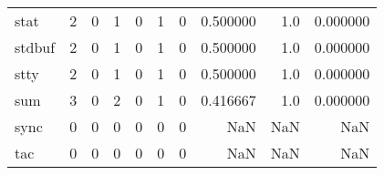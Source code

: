 \begin{longtable}{lrrrrrrrrr}
stat      &                                       2 &                                                  0 &                                                  1 &                                                  0 &                                                  1 &                                                  0 &                                           0.500000 &                                    1.0 &                             0.000000 \\
stdbuf    &                                       2 &                                                  0 &                                                  1 &                                                  0 &                                                  1 &                                                  0 &                                           0.500000 &                                    1.0 &                             0.000000 \\
stty      &                                       2 &                                                  0 &                                                  1 &                                                  0 &                                                  1 &                                                  0 &                                           0.500000 &                                    1.0 &                             0.000000 \\
sum       &                                       3 &                                                  0 &                                                  2 &                                                  0 &                                                  1 &                                                  0 &                                           0.416667 &                                    1.0 &                             0.000000 \\
sync      &                                       0 &                                                  0 &                                                  0 &                                                  0 &                                                  0 &                                                  0 &                                                NaN &                                    NaN &                                  NaN \\
tac       &                                       0 &                                                  0 &                                                  0 &                                                  0 &                                                  0 &                                                  0 &                                                NaN &                                    NaN &                                  NaN \\

\end{longtable}
